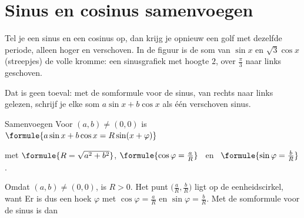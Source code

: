 \begin{oefeningen}
\end{oefeningen}

\section{Sinus en cosinus samenvoegen}

Tel je een sinus en een cosinus op, dan krijg je opnieuw een golf met dezelfde periode, alleen hoger en verschoven. In de figuur is de som van $\sin x$ en $\sqrt3\cos x$ (streepjes) de volle kromme: een sinusgrafiek met hoogte $2$, over $\frac{\pi}{3}$ naar links geschoven.


Dat is geen toeval: met de somformule voor de sinus, van rechts naar links gelezen, schrijf je elke som $a\sin x + b\cos x$ als één verschoven sinus.

\begin{theorie}
\begin{stelling}{Samenvoegen}
Voor $(a, b) \neq (0, 0)$ is \quad $\formule{a\sin x + b\cos x = R\sin(x + \varphi)}$

\vspace{1mm}
met \quad $\formule{R = \sqrt{a^2 + b^2}}$, \quad $\formule{\cos\varphi = \frac{a}{R}}$ \ en \ $\formule{\sin\varphi = \frac{b}{R}}$.
\end{stelling}
\begin{bewijs}
Omdat $(a, b) \neq (0, 0)$, is $R > 0$. Het punt $\bigl(\frac{a}{R}, \frac{b}{R}\bigr)$ ligt op de eenheidscirkel, want
Er is dus een hoek $\varphi$ met $\cos\varphi = \frac{a}{R}$ en $\sin\varphi = \frac{b}{R}$. Met de somformule voor de sinus is dan
\end{bewijs}
\end{theorie}

